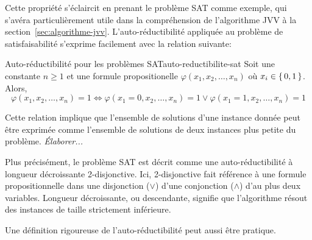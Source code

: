 Cette propriété s'éclaircit en prenant le problème SAT comme exemple, qui s'avéra particulièrement utile dans la compréhension de l'algorithme JVV à la section~\ref{sec:algorithme-jvv}. L'auto-réductibilité appliquée au problème de satisfaisabilité s'exprime facilement avec la relation suivante:

\begin{relation}{Auto-réductibilité pour les problèmes SAT}{auto-reductibilite-sat}
    Soit une constante $n \geq 1$ et une formule propositionelle $\varphi(x_{1}, x_{2}, \dots, x_{n})$ où $x_{i} \in \set{ 0, 1 }$. Alors,
    \begin{equation*}
        \varphi(x_{1}, x_{2}, \dots, x_{n}) = 1 \iff \varphi(x_{1}=0, x_{2}, \dots, x_{n}) = 1 \lor \varphi(x_{1}=1, x_{2}, \dots, x_{n}) = 1
    \end{equation*}
\end{relation}

Cette relation implique que l'ensemble de solutions d'une instance donnée peut être exprimée comme l'ensemble de solutions de deux instances plus petite du problème. \textcolor{mydarkred}{\textit{Élaborer...}}

Plus précisément, le problème SAT est décrit comme une auto-réductibilité à longueur décroissante 2-disjonctive. Ici, 2-disjonctive fait référence à une formule propositionnelle dans une disjonction ($\lor$) d'une conjonction ($\land$) d'au plus deux variables. Longueur décroissante, ou descendante, signifie que l'algorithme résout des instances de taille strictement inférieure.

Une définition rigoureuse de l'auto-réductibilité peut aussi être pratique.

